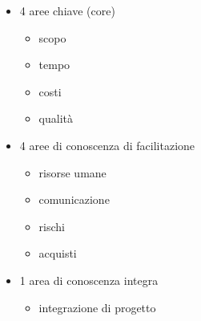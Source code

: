 \documentclass[answers, a4paper, 11pt]{exam}
\begin{document}
\begin{itemize}
    \item 4 aree chiave (core)
    \begin{itemize}
        \item scopo
        \item tempo
        \item costi
        \item qualità
    \end{itemize}
    \item 4 aree di conoscenza di facilitazione
    \begin{itemize}
        \item risorse umane
        \item comunicazione
        \item rischi
        \item acquisti
    \end{itemize}
    \item 1 area di conoscenza integra
    \begin{itemize}
        \item integrazione di progetto
    \end{itemize}
\end{itemize}
\end{document}
